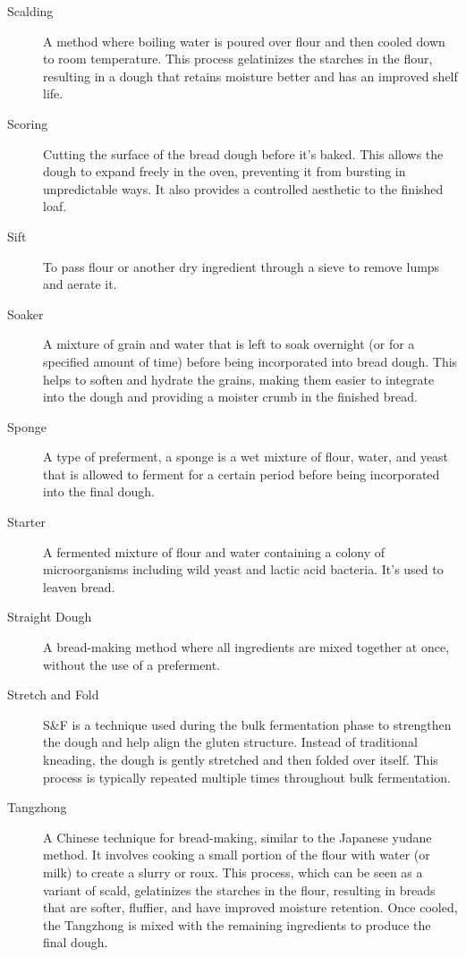 \begin{description}
\item[Scalding] A method where boiling water is poured over flour and then cooled
down to room temperature. This process gelatinizes the starches in the flour,
resulting in a dough that retains moisture better and has an improved shelf life.

\item[Scoring] Cutting the surface of the bread dough before it's baked. This
allows the dough to expand freely in the oven, preventing it from bursting in
unpredictable ways. It also provides a controlled aesthetic to the finished loaf.

\item[Sift] To pass flour or another dry ingredient through a sieve to
    remove lumps and aerate it.

\item[Soaker] A mixture of grain and water that is left to soak overnight (or for a
specified amount of time) before being incorporated into bread dough. This helps to
soften and hydrate the grains, making them easier to integrate into the dough and
providing a moister crumb in the finished bread.

\item[Sponge] A type of preferment, a sponge is a wet mixture of flour, water, and
yeast that is allowed to ferment for a certain period before being incorporated into
the final dough.

\item[Starter] A fermented mixture of flour and water containing a colony of
microorganisms including wild yeast and lactic acid bacteria. It's used to leaven
bread.

\item[Straight Dough] A bread-making method where all ingredients are mixed
together at once, without the use of a preferment.

\item[Stretch and Fold] S\&F is a technique used during the bulk fermentation phase
to strengthen the dough and help align the gluten structure. Instead of traditional
kneading, the dough is gently stretched and then folded over itself. This process is
typically repeated multiple times throughout bulk fermentation.

\item[Tangzhong] A Chinese technique for bread-making, similar to the
Japanese yudane method. It involves cooking a small portion of the flour
with water (or milk) to create a slurry or roux. This process, which can be seen as a
variant of scald, gelatinizes the starches in the flour, resulting in breads
that are softer, fluffier, and have improved moisture retention. Once cooled, the
Tangzhong is mixed with the remaining ingredients to produce the final dough.


\end{description}
